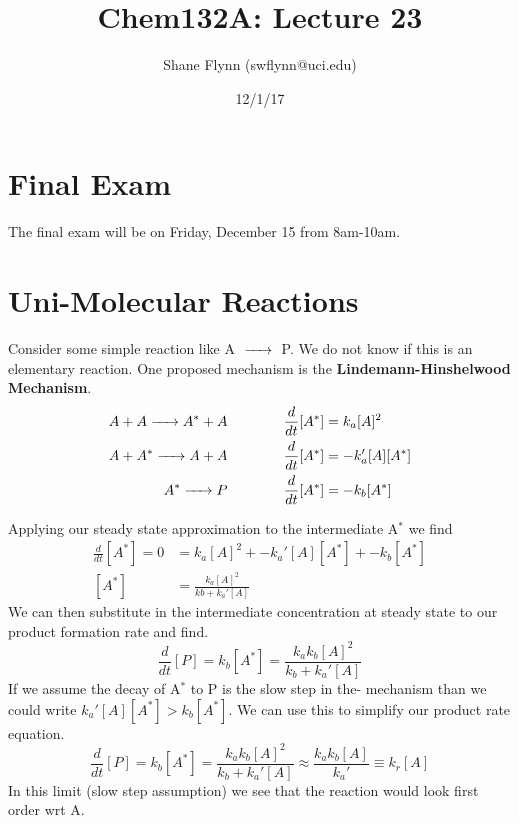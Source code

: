 \documentclass{article}
\title{Chem132A: Lecture 23}
\author{Shane Flynn (swflynn@uci.edu)}
\date{12/1/17}
\newcommand{\be}{\begin{equation}}
\newcommand{\ee}{\end{equation}}
\begin{document}
\maketitle

\section*{Final Exam}
The final exam will be on Friday, December 15 from 8am-10am. 

 \section*{Uni-Molecular Reactions}
 Consider some simple reaction like A $\ce{->}$ P. 
 We do not know if this is an elementary reaction.
 One proposed mechanism is the \textbf{Lindemann-Hinshelwood Mechanism}.
 \be
 \begin{split}
     A + A \ce{->} A^*  + A& \qquad \qquad \frac{
     d}{dt}[A^*] = k_a [A]^2 \\
     A + A^* \ce{->} A + A& \qquad \qquad \frac{
     d}{dt}[A^*] = -k_a' [A][A^*] \\
     A^* \ce{->} P& \qquad \qquad \frac{
     d}{dt}[A^*] = -k_b [A^*] \\
 \end{split}
 \ee
 
 Applying our steady state approximation to the intermediate A$^*$ we find
 \be
 \begin{split}
 \frac{
     d}{dt}[A^*] = 0 &= k_a [A]^2 + -k_a' [A][A^*]  + -k_b [A^*]\\
     [A^*] &= \frac{k_a[A]^2}{kb + k_a'[A]}
 \end{split}
 \ee
 We can then substitute in the intermediate concentration at steady state to our product formation rate and find. 
\be
\frac{d}{dt}[P] = k_b[A^*] = \frac{k_ak_b[A]^2}{k_b+k_a'[A]}
\ee
 If we assume the decay of A$^*$ to P is the slow step in the- mechanism than we could write $k_a'[A][A^*] > k_b[A^*]$. 
 We can use this to simplify our product rate equation. 
 \be
 \frac{d}{dt}[P] = k_b[A^*] = \frac{k_ak_b[A]^2}{k_b+k_a'[A]} \approx \frac{k_ak_b[A]}{k_a'} \equiv k_r[A]
 \ee
 In this limit (slow step assumption) we see that the reaction would look first order wrt A. 
 
\end{document}
